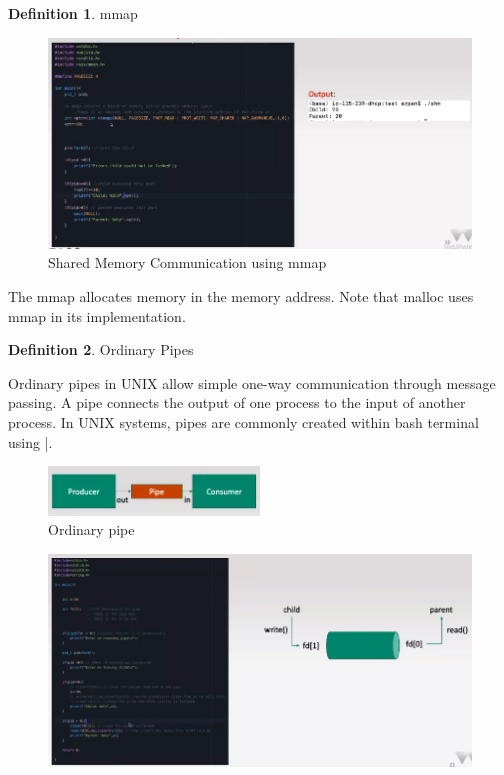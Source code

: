 \documentclass[a4paper]{article}
\theoremstyle{plain}
\theoremstyle{definition}
\newtheorem{defn}{Definition}[section]
\newtheorem{exmp}{Example}[section]
\theoremstyle{remark}
\begin{document}
\begin{tcolorbox}[colback=black!3!white,colframe=black!60!white,title=\begin{exmp}Examples of IPC \label{Examples of IPC}\end{exmp}, breakable, enhanced]
\begin{defn}
	mmap
\end{defn}
\begin{figure}[H]
	\centering
	\includegraphics[width=1\textwidth]{twelve.png}
	\caption{Shared Memory Communication using mmap}
	\label{fig:twelve-png}
\end{figure}        
The mmap allocates memory in the memory address. Note that malloc uses mmap in its implementation.
\begin{defn}
	Ordinary Pipes
\end{defn}
Ordinary pipes in UNIX allow simple one-way communication through message passing. A pipe connects the output of one process to the input of another process. In UNIX systems, pipes are commonly created within bash terminal using |. 
\begin{figure}[H]
	\centering
	\includegraphics[width=0.5\textwidth]{thirteen.png}
	\caption{Ordinary pipe}
	\label{fig:thirteen-png}
\end{figure}
\begin{figure}[H]
	\centering
	\includegraphics[width=1\textwidth]{fourteen.png}

\end{figure}
\end{tcolorbox}
\end{document}
